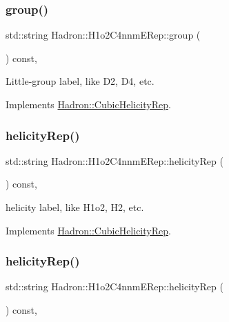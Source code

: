 \subsubsection{\texorpdfstring{group()}{group()}\hspace{0.1cm}{\footnotesize\ttfamily [2/2]}}
{\footnotesize\ttfamily std\+::string Hadron\+::\+H1o2\+C4nnm\+E\+Rep\+::group (\begin{DoxyParamCaption}{ }\end{DoxyParamCaption}) const\hspace{0.3cm}{\ttfamily [inline]}, {\ttfamily [virtual]}}

Little-\/group label, like D2, D4, etc. 

Implements \mbox{\hyperlink{structHadron_1_1CubicHelicityRep_a101a7d76cd8ccdad0f272db44b766113}{Hadron\+::\+Cubic\+Helicity\+Rep}}.

\mbox{\label{structHadron_1_1H1o2C4nnmERep_aa76e66e21088a552789c67e12cb4b72e}} 
\subsubsection{\texorpdfstring{helicityRep()}{helicityRep()}\hspace{0.1cm}{\footnotesize\ttfamily [1/2]}}
{\footnotesize\ttfamily std\+::string Hadron\+::\+H1o2\+C4nnm\+E\+Rep\+::helicity\+Rep (\begin{DoxyParamCaption}{ }\end{DoxyParamCaption}) const\hspace{0.3cm}{\ttfamily [inline]}, {\ttfamily [virtual]}}

helicity label, like H1o2, H2, etc. 

Implements \mbox{\hyperlink{structHadron_1_1CubicHelicityRep_af1096946b7470edf0a55451cc662f231}{Hadron\+::\+Cubic\+Helicity\+Rep}}.

\mbox{\label{structHadron_1_1H1o2C4nnmERep_aa76e66e21088a552789c67e12cb4b72e}} 
\subsubsection{\texorpdfstring{helicityRep()}{helicityRep()}\hspace{0.1cm}{\footnotesize\ttfamily [2/2]}}
{\footnotesize\ttfamily std\+::string Hadron\+::\+H1o2\+C4nnm\+E\+Rep\+::helicity\+Rep (\begin{DoxyParamCaption}{ }\end{DoxyParamCaption}) const\hspace{0.3cm}{\ttfamily [inline]}, {\ttfamily [virtual]}}

